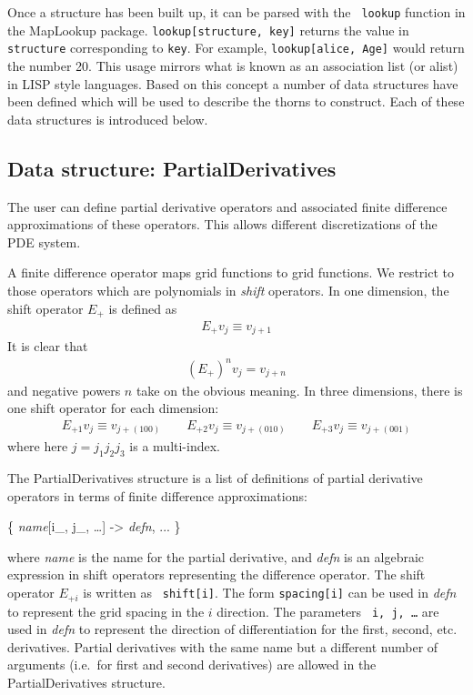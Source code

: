 \documentclass{report}
\begin{document}
Once a structure has been built up, it can be parsed with the {\tt
lookup} function in the MapLookup package.  {\tt lookup[structure,
key]} returns the value in {\tt structure} corresponding to {\tt key}.
For example, {\tt lookup[alice, Age]} would return the number 20.
This usage mirrors what is known as an association list (or alist) in
LISP style languages.
%
Based on this concept a number of data structures have been defined
which will be used to describe the thorns to construct.  Each of these
data structures is introduced below.

\subsection{Data structure: PartialDerivatives}

The user can define partial derivative operators and associated finite
difference approximations of these operators.  This allows different
discretizations of the PDE system.

A finite difference operator maps grid functions to grid functions.
We restrict to those operators which are polynomials in {\em shift}
operators.  In one dimension, the shift operator $E_+$ is defined as 
\begin{eqnarray}
E_+ v_j \equiv v_{j+1}
\end{eqnarray}
It is clear that
\begin{eqnarray}
(E_+)^n v_j = v_{j+n}
\end{eqnarray}
and negative powers $n$ take on the obvious meaning. In three
dimensions, there is one shift operator for each dimension:
\begin{eqnarray}
E_{+1} v_j \equiv v_{j+(100)} \qquad
E_{+2} v_j \equiv v_{j+(010)} \qquad
E_{+3} v_j \equiv v_{j+(001)}
\end{eqnarray}
where here $j = j_1 j_2 j_3$ is a multi-index.

The PartialDerivatives structure is a list of definitions of partial
derivative operators in terms of finite difference approximations:

\begin{center}
\begin{minipage}{0.8 \textwidth}
\begin{tt}
\{  {\it name}[i\_, j\_, \ldots] -> {\it defn}, ... \}
\end{tt}
\end{minipage}
\end{center}

where {\it name} is the name for the partial derivative, and {\it
defn} is an algebraic expression in shift operators representing the
difference operator.  The shift operator $E_{+i}$ is written as {\tt
shift[i]}. The form {\tt spacing[i]} can be used in {\it defn} to
represent the grid spacing in the $i$ direction.  The parameters {\tt
i, j, \ldots} are used in {\it defn} to represent the direction of
differentiation for the first, second, etc. derivatives.  Partial
derivatives with the same name but a different number of arguments
(i.e.~for first and second derivatives) are allowed in the
PartialDerivatives structure.
\end{document}
